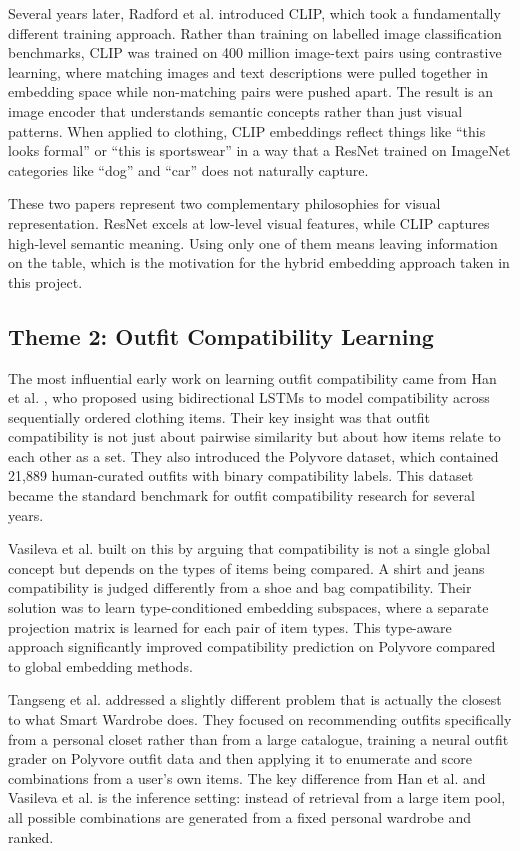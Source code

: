 \documentclass[conference]{IEEEtran}
\begin{document}
Several years later, Radford et al. \cite{b8} introduced CLIP, which took a fundamentally different training approach. Rather than training on labelled image classification benchmarks, CLIP was trained on 400 million image-text pairs using contrastive learning, where matching images and text descriptions were pulled together in embedding space while non-matching pairs were pushed apart. The result is an image encoder that understands semantic concepts rather than just visual patterns. When applied to clothing, CLIP embeddings reflect things like ``this looks formal'' or ``this is sportswear'' in a way that a ResNet trained on ImageNet categories like ``dog'' and ``car'' does not naturally capture.

These two papers represent two complementary philosophies for visual representation. ResNet excels at low-level visual features, while CLIP captures high-level semantic meaning. Using only one of them means leaving information on the table, which is the motivation for the hybrid embedding approach taken in this project.

\subsection{Theme 2: Outfit Compatibility Learning}

The most influential early work on learning outfit compatibility came from Han et al. \cite{b2}, who proposed using bidirectional LSTMs to model compatibility across sequentially ordered clothing items. Their key insight was that outfit compatibility is not just about pairwise similarity but about how items relate to each other as a set. They also introduced the Polyvore dataset, which contained 21,889 human-curated outfits with binary compatibility labels. This dataset became the standard benchmark for outfit compatibility research for several years.

Vasileva et al. \cite{b3} built on this by arguing that compatibility is not a single global concept but depends on the types of items being compared. A shirt and jeans compatibility is judged differently from a shoe and bag compatibility. Their solution was to learn type-conditioned embedding subspaces, where a separate projection matrix is learned for each pair of item types. This type-aware approach significantly improved compatibility prediction on Polyvore compared to global embedding methods.

Tangseng et al. \cite{b4} addressed a slightly different problem that is actually the closest to what Smart Wardrobe does. They focused on recommending outfits specifically from a personal closet rather than from a large catalogue, training a neural outfit grader on Polyvore outfit data and then applying it to enumerate and score combinations from a user's own items. The key difference from Han et al. and Vasileva et al. is the inference setting: instead of retrieval from a large item pool, all possible combinations are generated from a fixed personal wardrobe and ranked.
\end{document}
